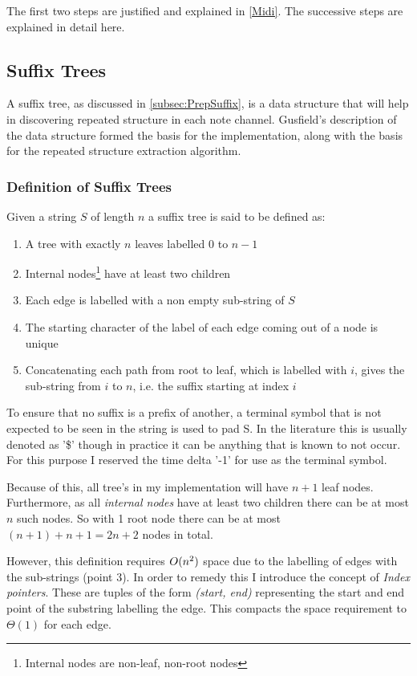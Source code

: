 \documentclass[12pt,twoside,notitlepage]{report}
\begin{document}
	The first two steps are justified and explained in \ref{Midi}. The successive steps are explained in detail here. 
		\subsection{\label{subsec:SuffixTree}Suffix Trees}
		A suffix tree, as discussed in \ref{subsec:PrepSuffix}, is a data structure that will help in discovering repeated structure in each note channel. Gusfield's\cite{Gusfield1999} description of the data structure formed the basis for the implementation, along with the basis for the repeated structure extraction algorithm.
		
			\subsubsection{Definition of Suffix Trees}
			Given a string $S$ of length $n$ a suffix tree is said to be defined as:
			\begin{enumerate}
			

				\item{A tree with exactly $n$ leaves labelled $0$ to $n-1$}
				\item{Internal nodes\footnote{Internal nodes are non-leaf, non-root nodes} have at least two children}
				\item{Each edge is labelled with a non empty sub-string of $S$}
				\item{The starting character of the label of each edge coming out of a node is unique}
				\item{Concatenating each path from root to leaf, which is labelled with $i$, gives the sub-string from $i$ to $n$, i.e. the suffix starting at index $i$}
\end{enumerate}
			
			To ensure that no suffix is a prefix of another, a terminal symbol that is not expected to be seen in the string is used to pad S. In the literature this is usually denoted as '\$' though in practice it can be anything that is known to not occur. For this purpose I reserved the time delta '-1' for use as the terminal symbol.

			Because of this, all tree's in my implementation will have $n+1$ leaf nodes. Furthermore, as all \emph{internal nodes} have at least two children there can be at most $n$ such nodes. So with 1 root node there can be at most $(n+1)+n+1 = 2n+2$ nodes in total.
			
			However, this definition requires $O(n\textsuperscript{2})$ space due to the labelling of edges with the sub-strings (point 3). In order to remedy this I introduce the concept of \emph{Index pointers}. These are tuples of the form \emph{(start, end)} representing the start and end point of the substring labelling the edge. This compacts the space requirement to $\Theta(1)$ for each edge.
			
\end{document}
